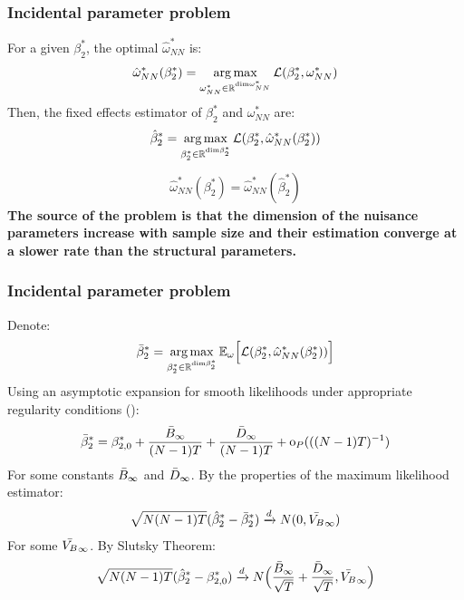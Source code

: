 \begin{frame}
    \frametitle{Incidental parameter problem}
For a given $\beta_2^*$, the optimal $\hat{\omega}_{NN}^*$ is:
\begin{align}
    \hat{\omega}_{NN}^*(\beta_2^*) = \operatorname*{arg\max}_{\omega_{NN}^* \in \mathbb{R}^{\text{dim} \omega_{NN}^*}} \mathcal{L} (\beta_2^*, \omega_{NN}^*)   
\end{align}
Then, the fixed effects estimator of $\beta_2^*$ and $\omega_{NN}^*$ are:
\begin{align} \label{eq:taylor}
    \hat{\beta}_2^* = \operatorname*{arg\max}_{\beta_2^* \in \mathbb{R}^{\text{dim} \beta_2^*}} \mathcal{L} (\beta_2^*, \hat{\omega}_{NN}^*(\beta_2^*))
 \end{align}
 \begin{align} \label{eq:omega}
     \hat{\omega}_{NN}^*(\beta_2^*) = \hat{\omega}_{NN}^*(\hat{\beta}_2^*)
 \end{align} 
 \textbf{The source of the problem is that the dimension of the nuisance parameters increase with sample size and their estimation converge at a slower rate than the structural parameters.}
\end{frame}

\begin{frame}
    \frametitle{Incidental parameter problem}
    Denote:
    $$\Bar{\beta}^*_2 = \operatorname*{arg\max}_{\beta^*_2 \in \mathbb{R}^{\text{dim} \beta^*_2}} \mathbb{E}_\omega \Big[\mathcal{L} (\beta^*_2, \hat{\omega}_{NN}^*(\beta^*_2)) \Big]$$
    Using an asymptotic expansion for smooth likelihoods under appropriate regularity conditions (\cite{fernandez2016individual}):
    \begin{align} \label{eq:val2}
        \Bar{\beta}_2^* = \beta_{2,0}^* + \frac{\Bar{B}_\infty}{(N-1)T} + \frac{\Bar{D}_\infty}{(N-1)T} + \text{o}_P(((N-1)T)^{-1})
    \end{align}
    For some constants $\Bar{B}_\infty$ and $\Bar{D}_\infty$. 
    By the properties of the maximum likelihood estimator:
    \begin{align}
        \sqrt{N(N-1)T} (\hat{\beta}_2^* - \Bar{\beta}_2^*) \xrightarrow{d} N(0, \Bar{V_B}_\infty)
    \end{align}
    For some $\Bar{V_B}_\infty$. By Slutsky Theorem:
    \begin{align} \label{eq:val3}
        \sqrt{N(N-1)T} (\hat{\beta}_2^* - \beta_{2,0}^*) \xrightarrow{d} N\Big( \frac{\Bar{B}_\infty}{\sqrt{T}} + \frac{\Bar{D}_\infty}{\sqrt{T}}, \Bar{V_B}_\infty\Big) \nonumber
    \end{align}
\end{frame}

